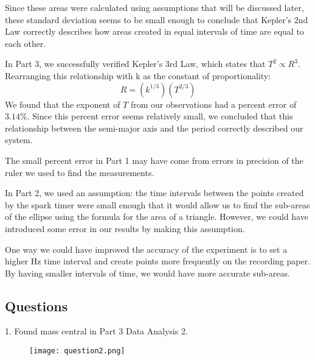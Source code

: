 \documentclass[fleqn]{article}
\begin{document}
Since these areas were calculated using assumptions that will be discussed later, these standard deviation seems to be small enough to conclude that Kepler's 2nd Law correctly describes how areas created in equal intervals of time are equal to each other.

In Part 3, we successfully verified Kepler's 3rd Law, which states that $T^2 \propto R^3$. Rearranging this relationship with k as the constant of proportionality:
\[ R = \left( k^{1/3 } \right) \left( T ^{2/3}  \right) \]
We found that the exponent of $T$ from our observations had a percent error of $3.14\%$. Since this percent error seems relatively small, we concluded that this relationship between the semi-major axis and the period correctly described our system.

The small percent error in Part 1 may have come from errors in precision of the ruler we used to find the measurements.

In Part 2, we used an assumption: the time intervals between the points created by the spark timer were small enough that it would allow us to find the sub-areas of the ellipse using the formula for the area of a triangle. However, we could have introduced some error in our results by making this assumption.

One way we could have improved the accuracy of the experiment is to set a higher Hz time interval and create points more frequently on the recording paper. By having smaller intervals of time, we would have more accurate sub-areas.

\subsection*{Questions}
1. Found mass central in Part 3 Data Analysis
2. \begin{figure}[H]
	\texttt{[image: question2.png]}
\end{figure}
\end{document}
